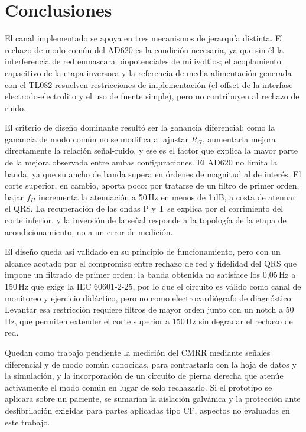 \documentclass[10pt]{article}
\begin{document}
\section{Conclusiones}


El canal implementado se apoya en tres mecanismos de jerarquía distinta. El rechazo de modo común del AD620 es la condición necesaria, ya que sin él la interferencia de red enmascara biopotenciales de milivoltios; el acoplamiento capacitivo de la etapa inversora y la referencia de media alimentación generada con el TL082 resuelven restricciones de implementación (el offset de la interfase electrodo-electrolito y el uso de fuente simple), pero no contribuyen al rechazo de ruido.

El criterio de diseño dominante resultó ser la ganancia diferencial: como la ganancia de modo común no se modifica al ajustar $R_G$, aumentarla mejora directamente la relación señal-ruido, y ese es el factor que explica la mayor parte de la mejora observada entre ambas configuraciones. El AD620 no limita la banda, ya que su ancho de banda supera en órdenes de magnitud al de interés. El corte superior, en cambio, aporta poco: por tratarse de un filtro de primer orden, bajar $f_H$ incrementa la atenuación a 50\,Hz en menos de 1\,dB, a costa de atenuar el QRS. La recuperación de las ondas P y T se explica por el corrimiento del corte inferior, y la inversión de la señal responde a la topología de la etapa de acondicionamiento, no a un error de medición.

El diseño queda así validado en su principio de funcionamiento, pero con un alcance acotado por el compromiso entre rechazo de red y fidelidad del QRS que impone un filtrado de primer orden: la banda obtenida no satisface los 0,05\,Hz a 150\,Hz que exige la IEC 60601-2-25, por lo que el circuito es válido como canal de monitoreo y ejercicio didáctico, pero no como electrocardiógrafo de diagnóstico. Levantar esa restricción requiere filtros de mayor orden junto con un notch a 50\,Hz, que permiten extender el corte superior a 150\,Hz sin degradar el rechazo de red.

Quedan como trabajo pendiente la medición del CMRR mediante señales diferencial y de modo común conocidas, para contrastarlo con la hoja de datos y la simulación, y la incorporación de un circuito de pierna derecha que atenúe activamente el modo común en lugar de solo rechazarlo. Si el prototipo se aplicara sobre un paciente, se sumarían la aislación galvánica y la protección ante desfibrilación exigidas para partes aplicadas tipo CF, aspectos no evaluados en este trabajo.
\end{document}
